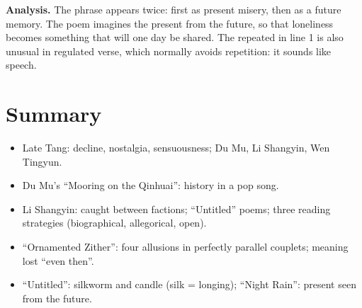\textbf{Analysis.} The phrase  appears twice: first as present misery, then
as a future memory. The poem imagines the present from the future, so that loneliness
becomes something that will one day be shared. The repeated  in line 1 is also
unusual in regulated verse, which normally avoids repetition: it sounds like speech.

\section*{Summary}
\begin{itemize}
  \item Late Tang: decline, nostalgia, sensuousness; Du Mu, Li Shangyin, Wen Tingyun.
  \item Du Mu's ``Mooring on the Qinhuai'': history in a pop song.
  \item Li Shangyin: caught between factions; ``Untitled'' poems; three reading strategies
        (biographical, allegorical, open).
  \item ``Ornamented Zither'': four allusions in perfectly parallel couplets; meaning lost
        ``even then''.
  \item ``Untitled'': silkworm and candle (silk = longing); ``Night Rain'': present seen
        from the future.
\end{itemize}
